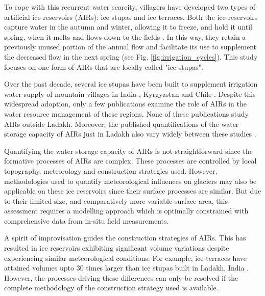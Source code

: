To cope with this recurrent water scarcity, villagers have developed two types of artificial ice reservoirs
(AIRs): ice stupas and ice terraces. Both the ice reservoirs capture water in the autumn and winter, allowing it
to freeze, and hold it until spring, when it melts and flows down to the fields
\citep{ipccChapterHighMountain2019, vinceGlacierMan2009, clouseLadakhArtificialGlaciers2017,
nusserSociohydrologyArtificialGlaciers2019}. In this way, they retain a previously unused portion of the annual
flow and facilitate its use to supplement the decreased flow in the next spring (see Fig.
\ref{fig:irrigation_cycles}). This study focuses on one form of AIRs that are locally called "ice stupas".

Over the past decade, several ice stupas have been built to supplement irrigation water supply of mountain
villages in India \citep{wangchukIceStupaCompetition2020, palmerStoringFrozenWater2022,
aggarwalAdaptationClimateChange2021}, Kyrgyzstan \citep{bbcnewsBrightArtificialGlacier2020} and Chile
\citep{reutersConservationistsChileAim2021}. Despite this widespread adoption, only a few publications examine
the role of AIRs in the water resource management of these regions. None of these publications study AIRs
outside Ladakh. Moreover, the published quantifications of the water storage capacity of AIRs just in Ladakh
also vary widely between these studies \citep{norphelSnowWaterHarvesting2015, baglaArtificialGlaciersHelp1998}.

Quantifying the water storage capacity of AIRs is not straightforward since the formative processes of AIRs are
complex. These processes are controlled by local topography, meteorology and construction strategies used.
However, methodologies used to quantify meteorological influences on glaciers may also be applicable on these
ice reservoirs since their surface processes are similar. But due to their limited size, and comparatively more
variable surface area, this assessment requires a modelling approach which is optimally constrained with
comprehensive data from in-situ field measurements. 

A spirit of improvisation guides the construction strategies of AIRs. This has resulted in ice reservoirs
exhibiting significant volume variations despite experiencing similar meteorological conditions. For example,
ice terraces have attained volumes upto 30 times larger than ice stupas built in Ladakh, India
\cite{nusserSociohydrologyArtificialGlaciers2019}. However, the processes driving these differences can only be
resolved if the complete methodology of the construction strategy used is available.

